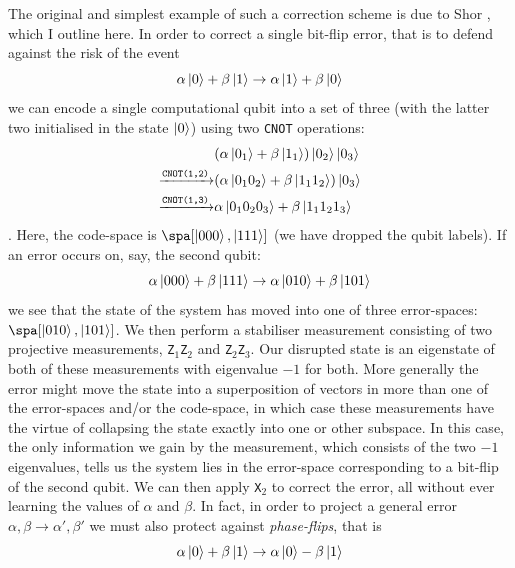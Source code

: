\documentclass{report}
\begin{document}
The original and simplest example of such a correction scheme is due to Shor \cite{shor_1995}, which I outline here. In order to correct a single bit-flip error, that is to defend against the risk of the event
\begin{equation*}
    \alpha\ket{0} + \beta\ket{1} \rightarrow \alpha\ket{1} + \beta\ket{0}
\end{equation*}
we can encode a single computational qubit into a set of three (with the latter two initialised in the state $\ket{0}$) using two \texttt{CNOT} operations:
\begin{equation*}
\begin{aligned}
    & (\alpha\ket{0_1} + \beta\ket{1_1})\ket{0_2}\ket{0_3}\\
      \xrightarrow{\texttt{CNOT(1,2)}} &(\alpha\ket{0_1 0_2} + \beta\ket{1_1 1_2})\ket{0_3} \\
     \xrightarrow{\texttt{CNOT(1,3)}}  &\alpha\ket{0_1 0_2 0_3} + \beta\ket{1_1 1_2 1_3}
\end{aligned}
\end{equation*}
. Here, the code-space is $\spa[\ket{0 0 0}, \ket{1 1 1}]$ (we have dropped the qubit labels). If an error occurs on, say, the second qubit:
\begin{equation}
    \alpha\ket{0 0 0} + \beta\ket{1 1 1} \rightarrow \alpha\ket{0 1 0} + \beta\ket{1 0 1}
\end{equation}
we see that the state of the system has moved into one of three error-spaces: $\spa[\ket{0 1 0}, \ket{1 0 1}]$. We then perform a stabiliser measurement consisting of two projective measurements, \texttt{Z$_1$Z$_2$} and \texttt{Z$_2$Z$_3$}. Our disrupted state is an eigenstate of both of these measurements with eigenvalue $-1$ for both. More generally the error might move the state into a superposition of vectors in more than one of the error-spaces and/or the code-space, in which case these measurements have the virtue of collapsing the state exactly into one or other subspace. In this case, the only information we gain by the measurement, which consists of the two $-1$ eigenvalues, tells us the system lies in the error-space corresponding to a bit-flip of the second qubit. We can then apply \texttt{X$_2$} to correct the error, all without ever learning the values of $\alpha$ and $\beta$. In fact, in order to project a general error $\alpha, \beta \rightarrow \alpha', \beta'$ we must also protect against \textit{phase-flips}, that is 
\begin{equation}
    \alpha\ket{0} + \beta\ket{1} \rightarrow \alpha\ket{0} - \beta\ket{1}
\end{equation}
\end{document}
